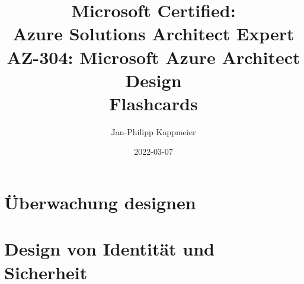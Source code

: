 \documentclass{scrartcl}
\newcommand{\sectioncard}[1]{
    \vspace*{\stretch{1}}
    \section{#1}
    \vspace*{\stretch{1}}
    \pagebreak
}
\begin{document}
    \title{Microsoft Certified:\\Azure Solutions Architect Expert\\\vspace{2mm}AZ-304: Microsoft Azure Architect Design\\Flashcards}
    \date{2022-03-07}
    \author{Jan-Philipp Kappmeier}

    \clearpage\maketitle
    \thispagestyle{empty}
    \pagebreak

    \sectioncard{Überwachung designen}

    
 
    
 
    \sectioncard{Design von Identität und Sicherheit}

    

    

    

    

    

    

    

    

    

    

    

    \doclicenseThis
    \pagebreak
\end{document}
